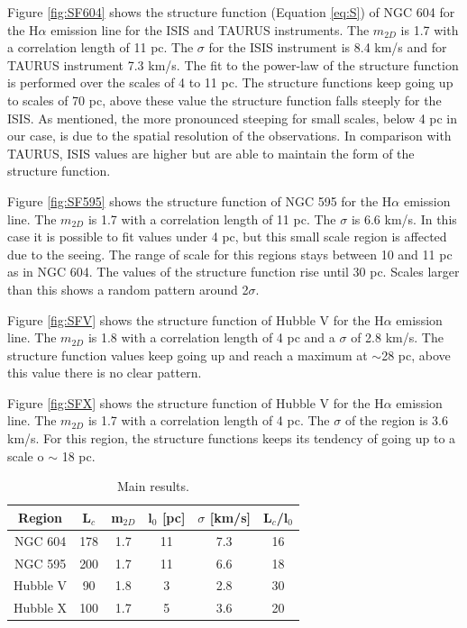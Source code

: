 \documentclass[fleqn,usenatbib]{mnras}
\begin{document}
Figure \ref{fig:SF604} shows the structure function (Equation \ref{eq:S}) of NGC 604 for the H$\alpha$ emission line for the ISIS and TAURUS instruments. The $m_{2D}$ is 1.7 with a correlation length of 11 pc. The $\sigma$ for the ISIS instrument is 8.4 km/s and for TAURUS instrument 7.3 km/s. The fit to the power-law of the structure function is performed over the scales of 4 to 11 pc. The structure functions keep going up to scales of 70 pc, above these value the structure function falls steeply for the ISIS. As \cite{arthur2016turbulence} mentioned, the more pronounced steeping for small scales, below 4 pc in our case, is due to the spatial resolution of the observations. In comparison with TAURUS, ISIS values are higher but are able to maintain the form of the structure function. 

Figure \ref{fig:SF595} shows the structure function of NGC 595 for the H$\alpha$ emission line. The $m_{2D}$ is 1.7 with a correlation length of 11 pc. The $\sigma$ is 6.6 km/s. In this case it is possible to fit values under 4 pc, but this small scale region is affected due to the seeing. The range of scale for this regions stays between 10 and 11 pc as in NGC 604. The values of the structure function rise until 30 pc. Scales larger than this shows a random pattern around 2$\sigma$.

Figure \ref{fig:SFV} shows the structure function of Hubble V for the H$\alpha$ emission line. The $m_{2D}$ is 1.8 with a correlation length of 4 pc and a $\sigma$ of 2.8 km/s. The structure function values keep going up and reach a maximum at $\sim$28 pc, above this value there is no clear pattern.

Figure \ref{fig:SFX} shows the structure function of Hubble V for the H$\alpha$ emission line. The $m_{2D}$ is 1.7 with a correlation length of 4 pc. The $\sigma$ of the region is 3.6 km/s. For this region, the structure functions keeps its tendency of going up to a scale o $\sim$ 18 pc.

\begin{table}
\begin{center}\caption{Main results.}
\begin{tabular}{cccccc}\hline
Region   & L$_{c}$  & m$_{2D}$  & l$_{0}$ [pc] & $\sigma$ [km/s] & L$_{c}$/l$_{0}$ \\\hline
NGC 604 & 178  &     1.7   &     11       &    7.3        & 16 	\\
NGC 595 & 200  &     1.7   &     11      &    6.6        & 18 	\\
Hubble V & 90  &     1.8   &     3       &    2.8      & 30 	\\
Hubble X & 100  &     1.7   &     5       &    3.6      & 20 	\\
\end{tabular}\label{tab:Res}
\end{center}
\end{table} 
\end{document}
